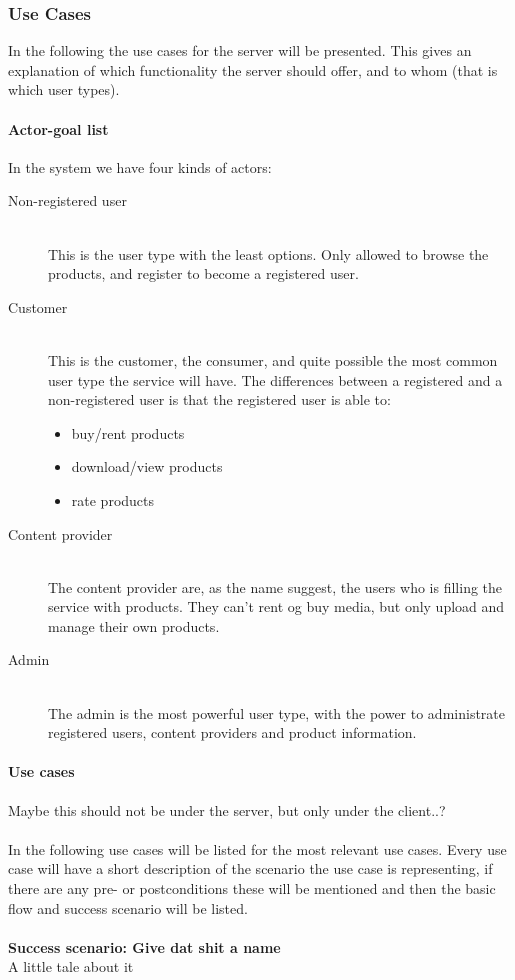 \subsubsection{Use Cases}
In the following the use cases for the server will be presented. This gives an explanation of which functionality the server should offer, and to whom (that is which user types).
\paragraph{Actor-goal list}
\label{s_actor-goal-list}
In the system we have four kinds of actors:
\begin{description}
	\item [Non-registered user] \hfill \\
		This is the user type with the least options. Only allowed to browse the products, and register to become a registered user.
	\item [Customer]  \hfill \\
		This is the customer, the consumer, and quite possible the most common user type the service will have. The differences between a registered and a non-registered user is that the registered user is able to:
		\begin{itemize}
			\item buy/rent products
			\item download/view products
			\item rate products
		\end{itemize}
	\item [Content provider] \hfill \\
		The content provider are, as the name suggest, the users who is filling the service with products. They can't rent og buy media, but only upload and manage their own products.
	\item [Admin] \hfill \\
		The admin is the most powerful user type, with the power to administrate registered users, content providers and product information.
\end{description}

\paragraph{Use cases}

Maybe this should not be under the server, but only under the client..?\\\\
In the following use cases will be listed for the most relevant use cases. Every use case will have a short description of the scenario the use case is representing, if there are any pre- or postconditions these will be mentioned and then the basic flow and success scenario will be listed.
\\\\
\textbf{Success scenario: Give dat shit a name} \\
A little tale about it

